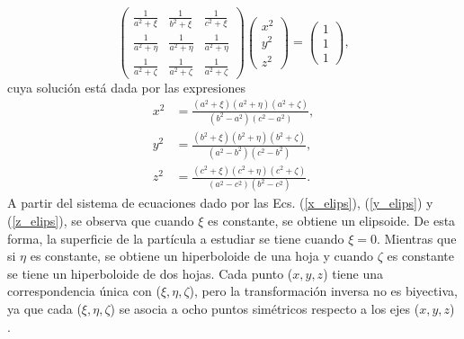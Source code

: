 	\begin{equation*}
		\begin{pmatrix}
			\frac{1}{a^2+\xi} & \frac{1}{b^2+\xi} & \frac{1}{c^2+\xi}\\
			\frac{1}{a^2+\eta} & \frac{1}{a^2+\eta} & \frac{1}{a^2+\eta}\\
			\frac{1}{a^2+\zeta} & \frac{1}{a^2+\zeta} & \frac{1}{a^2+\zeta}\end{pmatrix}\begin{pmatrix}
			x^2\\
			y^2\\
			z^2
		\end{pmatrix}=\begin{pmatrix}
			1\\
			1\\
			1
		\end{pmatrix},
	\end{equation*}
%	
cuya solución está dada por las expresiones
\begin{align}
	x^2&=\frac{(a^2+\xi)(a^2+\eta)(a^2+\zeta)}{(b^2-a^2)(c^2-a^2)},\label{x_elips}\\
	y^2&=\frac{(b^2+\xi)(b^2+\eta)(b^2+\zeta)}{(a^2-b^2)(c^2-b^2)},\label{y_elips}\\
	z^2&=\frac{(c^2+\xi)(c^2+\eta)(c^2+\zeta)}{(a^2-c^2)(b^2-c^2)}. \label{z_elips}    
\end{align}
A partir del sistema de ecuaciones dado por las Ecs. (\ref{x_elips}), (\ref{y_elips}) y (\ref{z_elips}), se observa que cuando $\xi$ es constante, se obtiene un elipsoide. De esta forma, la superficie de la partícula a estudiar se tiene cuando $\xi=0$. Mientras que si $\eta$ es constante, se obtiene un hiperboloide de una hoja y cuando $\zeta$ es constante se tiene un hiperboloide de dos hojas. Cada punto ($x,y,z$) tiene una correspondencia única con ($\xi,\eta,\zeta$), pero la transformación inversa no es biyectiva, ya que cada ($\xi,\eta,\zeta$) se asocia a ocho puntos simétricos respecto a los ejes ($x,y,z$) \cite{Cambdrige}. \\

